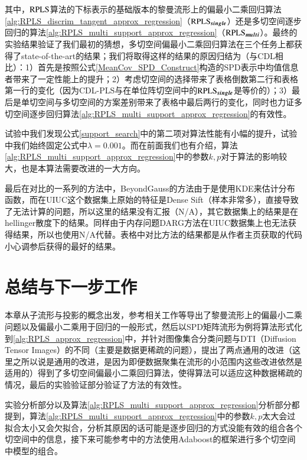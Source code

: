 其中，$\rm RPLS$算法的下标表示的基础版本的黎曼流形上的偏最小二乘回归算法\ref{alg:RPLS_discrim_tangent_approx_regression}（$\rm \bm{RPLS_{single}}$）还是多切空间逐步回归的算法\ref{alg:RPLS_multi_support_approx_regression}（$\rm \bm{RPLS_{multi}}$）。最终的实验结果验证了我们最初的猜想，多切空间偏最小二乘回归算法在三个任务上都获得了state-of-the-art的结果；我们将取得这样的结果的原因归结为（与CDL\cite{Statistics_CDL}相比）：1）首先是按照公式\ref{MeanCov_SPD_Construct}构造的SPD表示中均值信息者带来了一定性能上的提升；2）考虑切空间的选择带来了表格倒数第二行和表格第一行的变化（因为CDL-PLS与在单位阵切空间中的$\rm \bm{RPLS_{single}}$是等价的）；3）最后是单切空间与多切空间的方案差别带来了表格中最后两行的变化，同时也力证多切空间逐步回归算法\ref{alg:RPLS_multi_support_approx_regression}的有效性。

试验中我们发现公式\ref{support_search}中的第二项对算法性能有小幅的提升，试验中我们始终固定公式中$\lambda=0.001$。而在前面我们也有介绍，算法\ref{alg:RPLS_multi_support_approx_regression}中的参数$k,p$对于算法的影响较大，也是本算法需要改进的一大方向。

最后在对比的一系列的方法中，BeyondGauss\cite{Statistics_BeyondGauss}的方法由于是使用KDE来估计分布函数，而在UIUC\cite{Database_UIUC}这个数据集上原始的特征是Dense Sift（样本非常多），直接导致了无法计算的问题，所以这里的结果没有汇报（N/A），其它数据集上的结果是在hellinger散度下的结果。同样由于内存问题DARG\cite{Statistics_DARG}方法在UIUC\cite{Database_UIUC}数据集上也无法获得结果，所以也使用N/A代替。表格中对比方法的结果都是从作者主页获取的代码小心调参后获得的最好的结果。
\section{总结与下一步工作}
\label{sec:conclusion_futurework}
本章从子流形与投影的概念出发，参考相关工作\cite{PGA,RCCA,AIM_metric,Statistics_CDL}等导出了黎曼流形上的偏最小二乘问题以及偏最小二乘用于回归的一般形式，然后以SPD矩阵流形为例将算法形式化到\ref{alg:RPLS_approx_regression}中，并针对图像集合分类问题与DTI（Diffusion Tensor Images）的不同（主要是数据更稀疏的问题），提出了两点通用的改进（这里之所以说是通用的改进，是因为即便数据聚集在流形的小范围内这些改进依然是适用的）得到了多切空间偏最小二乘回归算法，使得算法可以适应这种数据稀疏的情况，最后的实验验证部分验证了方法的有效性。

实验分析部分以及算法\ref{alg:RPLS_multi_support_approx_regression}分析部分都提到，算法\ref{alg:RPLS_multi_support_approx_regression}中的参数$k,p$太大会过拟合太小又会欠拟合，分析其原因的话可能是逐步回归的方式没能有效的组合各个切空间中的信息，接下来可能参考\cite{RegionCov_pedestrain}中的方法使用Adaboost的框架进行多个切空间中模型的组合。